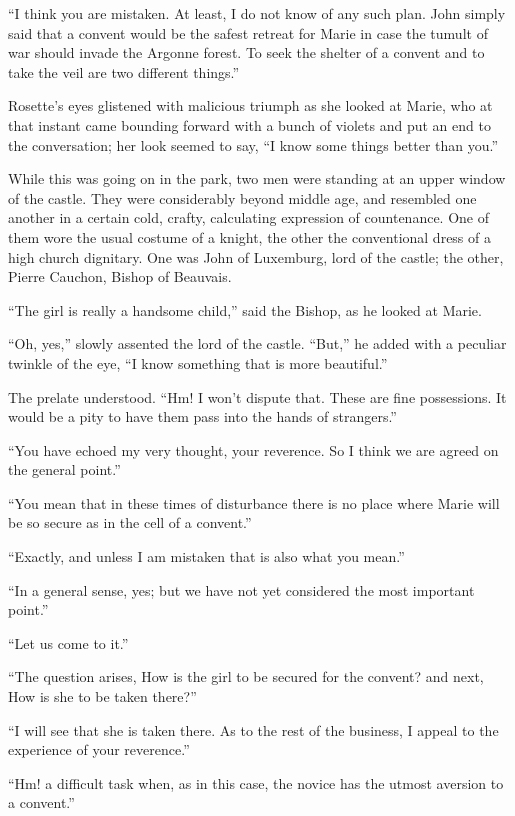 ``I think you are mistaken. At least, I do not know of any such plan.
John simply said that a convent would be the safest retreat for Marie in
case the tumult of war should invade the Argonne forest. To seek the
shelter of a convent and to take the veil are two different things.''

Rosette's eyes glistened with malicious triumph as she looked at Marie,
who at that instant came bounding forward with a bunch of violets and
put an end to the conversation; her look seemed to say, ``I know some
things better than you.''

While this was going on in the park, two men were standing at an upper
window of the castle. They were considerably beyond middle age, and
resembled one another in a certain cold, crafty, calculating expression
of countenance. One of them wore the usual costume of a knight, the
other the conventional dress of a high church dignitary. One was John of
Luxemburg, lord of the castle; the other, Pierre Cauchon, Bishop of
Beauvais.

``The girl is really a handsome child,'' said the Bishop, as he looked
at Marie.

``Oh, yes,'' slowly assented the lord of the castle. ``But,'' he added
with a peculiar twinkle of the eye, ``I know something that is more
beautiful.''

The prelate understood. ``Hm! I won't dispute that. These are fine
possessions. It would be a pity to have them pass into the hands of
strangers.''

``You have echoed my very thought, your reverence. So I think we are
agreed on the general point.''

``You mean that in these times of disturbance there is no place where
Marie will be so secure as in the cell of a convent.''

``Exactly, and unless I am mistaken that is also what you mean.''

``In a general sense, yes; but we have not yet considered the most
important point.''

``Let us come to it.''

``The question arises, How is the girl to be secured for the convent?
and next, How is she to be taken there?''

``I will see that she is taken there. As to the rest of the business, I
appeal to the experience of your reverence.''

``Hm! a difficult task when, as in this case, the novice has the utmost
aversion to a convent.''

